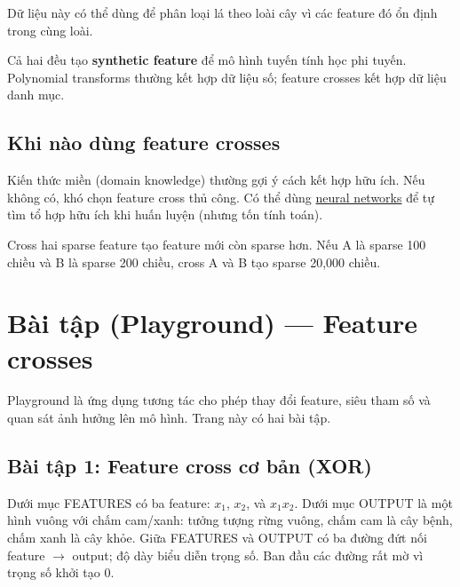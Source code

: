 \documentclass[12pt,a4paper]{article}
\begin{document}
\begin{luuy}
Dữ liệu này có thể dùng để phân loại lá theo loài cây vì các feature đó ổn định trong cùng loài.
\end{luuy}

\begin{ynghia}[title={So sánh nhanh với polynomial transforms}]
Cả hai đều tạo \textbf{synthetic feature} để mô hình tuyến tính học phi tuyến. Polynomial transforms thường kết hợp dữ liệu số; feature crosses kết hợp dữ liệu danh mục.
\end{ynghia}

\subsection{Khi nào dùng feature crosses}

\begin{luuy}
Kiến thức miền (domain knowledge) thường gợi ý cách kết hợp hữu ích. Nếu không có, khó chọn feature cross thủ công. Có thể dùng \href{https://developers.google.com/machine-learning/crash-course/neural-networks}{neural networks} để tự tìm tổ hợp hữu ích khi huấn luyện (nhưng tốn tính toán).
\end{luuy}

\begin{luuy}[title={Cẩn thận: cross làm bùng nổ chiều và càng sparse}]
Cross hai sparse feature tạo feature mới còn sparse hơn. Nếu A là sparse 100 chiều và B là sparse 200 chiều, cross A và B tạo sparse 20{,}000 chiều.
\end{luuy}

\section{Bài tập (Playground) --- Feature crosses}

\begin{ynghia}
Playground là ứng dụng tương tác cho phép thay đổi feature, siêu tham số và quan sát ảnh hưởng lên mô hình. Trang này có hai bài tập.
\end{ynghia}

\subsection{Bài tập 1: Feature cross cơ bản (XOR)}

\begin{phuongphap}[title={Giao diện cần chú ý}]
Dưới mục FEATURES có ba feature: \(x_1\), \(x_2\), và \(x_1x_2\). Dưới mục OUTPUT là một hình vuông với chấm cam/xanh: tưởng tượng rừng vuông, chấm cam là cây bệnh, chấm xanh là cây khỏe. Giữa FEATURES và OUTPUT có ba đường đứt nối feature \(\to\) output; độ dày biểu diễn trọng số. Ban đầu các đường rất mờ vì trọng số khởi tạo 0.
\end{phuongphap}
\end{document}

